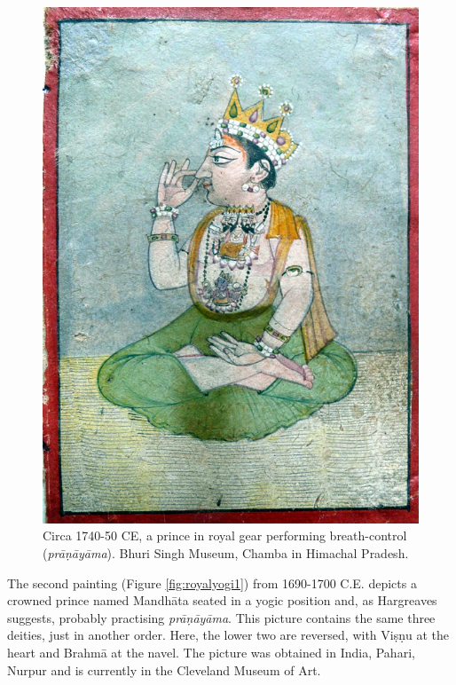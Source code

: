 \begin{figure}[ht]
	\centering
  \includegraphics[width=1\textwidth]{pics/royalyogi2.jpg}
	\caption{Circa 1740-50 CE, a prince in royal gear performing breath-control (\textit{prāṇāyāma}). Bhuri Singh Museum, Chamba in Himachal Pradesh.}
	\label{fig:royalyogi2}
\end{figure}

The second painting (Figure \ref{fig:royalyogi1}) from 1690-1700 C.E. depicts a crowned prince named Mandhāta seated in a yogic position and, as Hargreaves suggests, probably practising \textit{prāṇāyāma}. This picture contains the same three deities, just in another order. Here, the lower two are reversed, with Viṣṇu at the heart and Brahmā at the navel. The picture was obtained in India, Pahari, Nurpur and is currently in the Cleveland Museum of Art.

